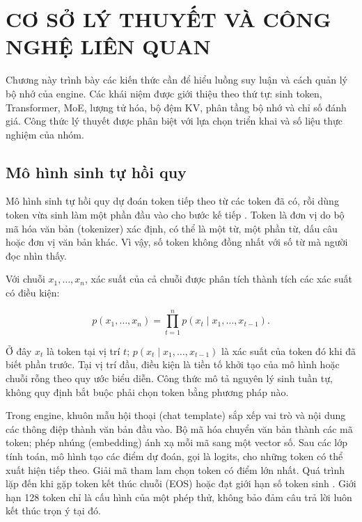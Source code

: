 \chapter{CƠ SỞ LÝ THUYẾT VÀ CÔNG NGHỆ LIÊN QUAN}


Chương này trình bày các kiến thức cần để hiểu luồng suy luận và cách quản lý bộ nhớ của engine. Các khái niệm được giới thiệu theo thứ tự: sinh token, Transformer, MoE, lượng tử hóa, bộ đệm KV, phân tầng bộ nhớ và chỉ số đánh giá. Công thức lý thuyết được phân biệt với lựa chọn triển khai và số liệu thực nghiệm của nhóm.

\section{Mô hình sinh tự hồi quy}

Mô hình sinh tự hồi quy dự đoán token tiếp theo từ các token đã có, rồi dùng token vừa sinh làm một phần đầu vào cho bước kế tiếp \cite{vaswani_attention}. Token là đơn vị do bộ mã hóa văn bản (tokenizer) xác định, có thể là một từ, một phần từ, dấu câu hoặc đơn vị văn bản khác. Vì vậy, số token không đồng nhất với số từ mà người đọc nhìn thấy.

Với chuỗi $x_1,\ldots,x_n$, xác suất của cả chuỗi được phân tích thành tích các xác suất có điều kiện:

\begin{equation}
\label{eq:2.1}
p(x_1,\ldots,x_n)=\prod_{t=1}^{n}p(x_t\mid x_1,\ldots,x_{t-1}).
\end{equation}

Ở đây $x_t$ là token tại vị trí $t$; $p(x_t\mid x_1,\ldots,x_{t-1})$ là xác suất của token đó khi đã biết phần trước. Tại vị trí đầu, điều kiện là tiền tố khởi tạo của mô hình hoặc chuỗi rỗng theo quy ước biểu diễn. Công thức mô tả nguyên lý sinh tuần tự, không quy định bắt buộc phải chọn token bằng phương pháp nào.

Trong engine, khuôn mẫu hội thoại (chat template) sắp xếp vai trò và nội dung các thông điệp thành văn bản đầu vào. Bộ mã hóa chuyển văn bản thành các mã token; phép nhúng (embedding) ánh xạ mỗi mã sang một vector số. Sau các lớp tính toán, mô hình tạo các điểm dự đoán, gọi là logits, cho những token có thể xuất hiện tiếp theo. Giải mã tham lam chọn token có điểm lớn nhất. Quá trình lặp đến khi gặp token kết thúc chuỗi (EOS) hoặc đạt giới hạn số token sinh \cite{moe_tierengine_arch}. Giới hạn 128 token chỉ là cấu hình của một phép thử, không bảo đảm câu trả lời luôn kết thúc trọn ý tại đó.

